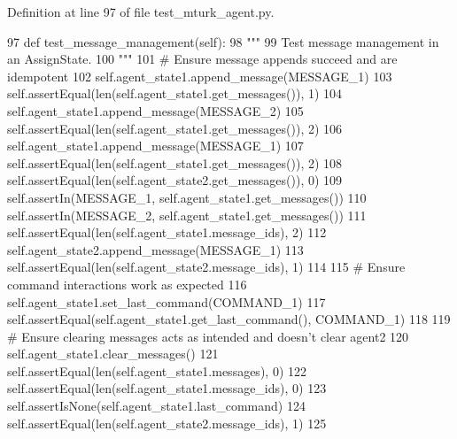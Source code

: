 Definition at line 97 of file test\+\_\+mturk\+\_\+agent.\+py.


\begin{DoxyCode}
97     \textcolor{keyword}{def }test\_message\_management(self):
98         \textcolor{stringliteral}{"""}
99 \textcolor{stringliteral}{        Test message management in an AssignState.}
100 \textcolor{stringliteral}{        """}
101         \textcolor{comment}{# Ensure message appends succeed and are idempotent}
102         self.agent\_state1.append\_message(MESSAGE\_1)
103         self.assertEqual(len(self.agent\_state1.get\_messages()), 1)
104         self.agent\_state1.append\_message(MESSAGE\_2)
105         self.assertEqual(len(self.agent\_state1.get\_messages()), 2)
106         self.agent\_state1.append\_message(MESSAGE\_1)
107         self.assertEqual(len(self.agent\_state1.get\_messages()), 2)
108         self.assertEqual(len(self.agent\_state2.get\_messages()), 0)
109         self.assertIn(MESSAGE\_1, self.agent\_state1.get\_messages())
110         self.assertIn(MESSAGE\_2, self.agent\_state1.get\_messages())
111         self.assertEqual(len(self.agent\_state1.message\_ids), 2)
112         self.agent\_state2.append\_message(MESSAGE\_1)
113         self.assertEqual(len(self.agent\_state2.message\_ids), 1)
114 
115         \textcolor{comment}{# Ensure command interactions work as expected}
116         self.agent\_state1.set\_last\_command(COMMAND\_1)
117         self.assertEqual(self.agent\_state1.get\_last\_command(), COMMAND\_1)
118 
119         \textcolor{comment}{# Ensure clearing messages acts as intended and doesn't clear agent2}
120         self.agent\_state1.clear\_messages()
121         self.assertEqual(len(self.agent\_state1.messages), 0)
122         self.assertEqual(len(self.agent\_state1.message\_ids), 0)
123         self.assertIsNone(self.agent\_state1.last\_command)
124         self.assertEqual(len(self.agent\_state2.message\_ids), 1)
125 
\end{DoxyCode}
\mbox{\label{classparlai_1_1mturk_1_1core_1_1legacy__2018_1_1test_1_1test__mturk__agent_1_1TestAssignState_a5283dee3082b124f1c3892d98ca11fa5}} 
